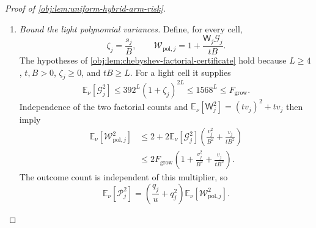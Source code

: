 \documentclass[11pt]{article}
\begin{document}
\begin{proof}[Proof of \cref{obj:lem:uniform-hybrid-arm-risk}]
\begin{enumerate}
For \(s_j>0\), overlap implies
\[
\frac{v_j^2}{s_j}\le\frac{p_j}{\epsilon},
\qquad
q_j,v_j\le\frac{p_j}{\epsilon}.
\]
Indeed, \(\epsilon v_j\le s_j\), and multiplying by \(v_j\le p_j\) proves the first bound. The elementary inequalities
\[
0\le\frac{ts_j}{1+ts_j}\le1,
\qquad
ts_j\le(1+ts_j)^2
\]
give the four rational bounds
\[
\begin{aligned}
\frac{s_j(tv_j)^2}{(1+ts_j)^2}
&\le\frac{v_j^2}{s_j},&
\frac{s_jtv_j}{(1+ts_j)^2}
&\le v_j,\\
\frac{s_j^2tv_j}{(1+ts_j)^2}
&\le\frac{v_j}{t},&
\frac{s_j^2(tv_j)^2ts_j}{(1+ts_j)^4}
&\le\frac{v_j^2}{ts_j}.
\end{aligned}
\]
For example, the first, third, and fourth left-hand sides equal their respective right-hand sides multiplied by
\((ts_j/(1+ts_j))^2\), \((ts_j/(1+ts_j))^2\), and
\((ts_j/(1+ts_j))^4\). Hence \(q_j\le s_j\) gives
\[
q_j\frac{(tv_j)^2+tv_j}{(1+ts_j)^2}
\le\frac{v_j^2}{s_j}+v_j
\le\frac{2p_j}{\epsilon},
\]
\[
q_j^2\left\{
\frac{tv_j}{(1+ts_j)^2}
+\frac{(tv_j)^2ts_j}{(1+ts_j)^4}
\right\}
\le\frac{v_j}{t}+\frac{v_j^2}{ts_j}
\le\frac{2p_j}{t\epsilon}.
\]
Substitution into the variance identity proves
\[
\operatorname{Var}_\nu(\mathcal H_j)
\le C_{\mathrm{inv}}p_j
\left(\frac1{u\epsilon}+\frac1{t\epsilon}\right).
\]
For \(s_j=0\), both sides vanish by the null-cell identities already established. Summing over all cells gives
\[
\sum_{j=1}^d\operatorname{Var}_\nu(\mathcal H_j)
\le C_{\mathrm{inv}}
\left(\frac1{u\epsilon}+\frac1{t\epsilon}\right).
\]

\item \textit{Bound the light polynomial variances.}
Define, for every cell,
\[
\zeta_j=\frac{s_j}{B},
\qquad
\mathcal W_{\mathrm{pol},j}
=1+\frac{\mathsf W_j\mathcal G_j}{tB}.
\]
The hypotheses of \cref{obj:lem:chebyshev-factorial-certificate} hold because \(L\ge4\), \(t,B>0\), \(\zeta_j\ge0\), and \(tB\ge L\). For a light cell it supplies
\[
\mathbb E_\nu[\mathcal G_j^2]
\le392^L(1+\zeta_j)^{2L}
\le1568^L
\le F_{\mathrm{grow}}.
\]
Independence of the two factorial counts and
\(\mathbb E_\nu[\mathsf W_j^2]=(tv_j)^2+tv_j\) then imply
\[
\begin{aligned}
\mathbb E_\nu[\mathcal W_{\mathrm{pol},j}^2]
&\le
2+2\mathbb E_\nu[\mathcal G_j^2]
\left(\frac{v_j^2}{B^2}+\frac{v_j}{tB^2}\right)\\
&\le
2F_{\mathrm{grow}}
\left(1+\frac{v_j^2}{B^2}+\frac{v_j}{tB^2}\right).
\end{aligned}
\]
The outcome count is independent of this multiplier, so
\[
\mathbb E_\nu[\mathcal P_j^2]
=
\left(\frac{q_j}{u}+q_j^2\right)
\mathbb E_\nu[\mathcal W_{\mathrm{pol},j}^2].
\]


\end{enumerate}
\end{proof}
\end{document}
